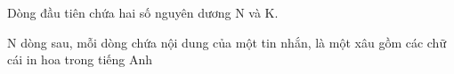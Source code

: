 Dòng đầu tiên chứa hai số nguyên dương N và K.

N dòng sau, mỗi dòng chứa nội dung của một tin nhắn, là một xâu gồm các chữ cái in hoa trong tiếng Anh